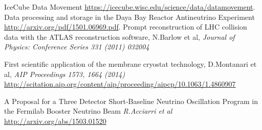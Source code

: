 \begin{thebibliography}{99}
 IceCube Data Movement \url{https://icecube.wisc.edu/science/data/datamovement}.
Data processing and storage in the Daya Bay Reactor Antineutrino Experiment \url{http://arxiv.org/pdf/1501.06969.pdf}.
 Prompt reconstruction of LHC collision data with the ATLAS reconstruction software, N.Barlow et al, \textit{Journal of Physics: Conference Series 331 (2011) 032004}

 First scientific application of the membrane cryostat technology, D.Montanari et al, \textit{AIP Proceedings 1573, 1664 (2014)} \url{http://scitation.aip.org/content/aip/proceeding/aipcp/10.1063/1.4860907}

  A Proposal for a Three Detector Short-Baseline Neutrino Oscillation Program in the Fermilab Booster Neutrino Beam \textit{R.Acciarri et al} \url{http://arxiv.org/abs/1503.01520}
 
 
\end{thebibliography}